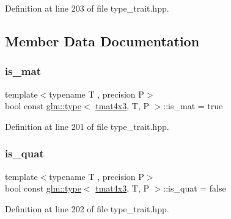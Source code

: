 Definition at line 203 of file type\+\_\+trait.\+hpp.



\subsection{Member Data Documentation}
\mbox{\label{structglm_1_1type_3_01tmat4x3_00_01_t_00_01_p_01_4_a1f5540d696a1308c534093c44c389f8a}} 
\subsubsection{\texorpdfstring{is\_mat}{is\_mat}}
{\footnotesize\ttfamily template$<$typename T , precision P$>$ \\
bool const \mbox{\hyperlink{structglm_1_1type}{glm\+::type}}$<$ \mbox{\hyperlink{structglm_1_1tmat4x3}{tmat4x3}}, T, P $>$\+::is\+\_\+mat = true\hspace{0.3cm}{\ttfamily [static]}}



Definition at line 201 of file type\+\_\+trait.\+hpp.

\mbox{\label{structglm_1_1type_3_01tmat4x3_00_01_t_00_01_p_01_4_a0c8a60f09e04cac5f9bd175708edb29e}} 
\subsubsection{\texorpdfstring{is\_quat}{is\_quat}}
{\footnotesize\ttfamily template$<$typename T , precision P$>$ \\
bool const \mbox{\hyperlink{structglm_1_1type}{glm\+::type}}$<$ \mbox{\hyperlink{structglm_1_1tmat4x3}{tmat4x3}}, T, P $>$\+::is\+\_\+quat = false\hspace{0.3cm}{\ttfamily [static]}}



Definition at line 202 of file type\+\_\+trait.\+hpp.

\mbox{\label{structglm_1_1type_3_01tmat4x3_00_01_t_00_01_p_01_4_a8c22325c199636bab17e66d3e5572d8b}} 
